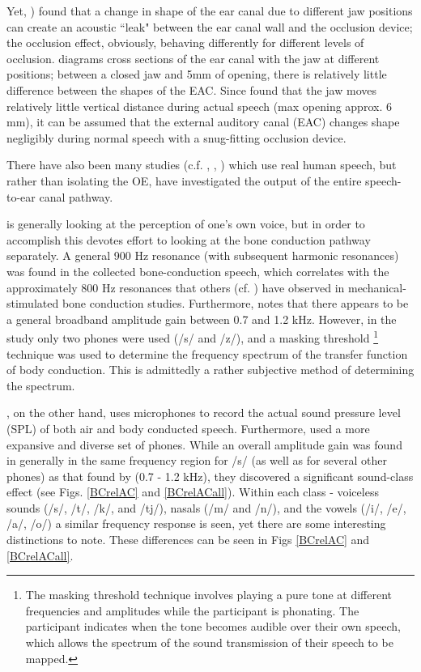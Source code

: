 \documentclass[dissertation,copyright]{uathesis}
\begin{document}
Yet, \cite{hansen:97b}) found that a change in shape of the ear canal due to different jaw positions can create an acoustic ``leak" between the ear canal wall and the occlusion device; the occlusion effect, obviously, behaving differently for different levels of occlusion. 
\cite{hansen:97b} diagrams cross sections of the ear canal with the jaw at different positions; between a closed jaw and 5mm of opening, there is relatively little difference between the shapes of the EAC.  Since \cite{borghese:97} found that the jaw moves relatively little vertical distance during actual speech (max opening approx. 6 mm), it can be assumed that the external auditory canal (EAC) changes shape negligibly during normal speech with a snug-fitting occlusion device. 



There have also been many studies (c.f. \cite{bekesy:48}, \cite{porschmann:00}, \cite{reinfeldt:10}) which use real human speech, but rather than isolating the OE, have investigated the output of the entire speech-to-ear canal pathway.

\cite{porschmann:00} is generally looking at the perception of one's own voice, but in order to accomplish this devotes effort to looking at the bone conduction pathway separately.  A general 900 Hz resonance (with subsequent harmonic resonances) was found in the collected bone-conduction speech, which correlates with the approximately 800 Hz resonances that others  (cf. \cite{tonndorf:97}) have observed in mechanical-stimulated bone conduction studies.  Furthermore, \cite{porschmann:00} notes that there appears to be a general broadband amplitude gain between 0.7 and 1.2 kHz. However, in the study only two phones were used (/s/ and /z/), and a masking threshold \footnote{The masking threshold technique involves playing a pure tone at different frequencies and amplitudes while the participant is phonating. The participant indicates when the tone becomes audible over their own speech, which allows the spectrum of the sound transmission of their speech to be mapped.} technique was used to determine the frequency spectrum of the transfer function of body conduction.  This is admittedly a rather subjective method of determining the spectrum.  

\cite{reinfeldt:10}, on the other hand, uses microphones to record the actual sound pressure level (SPL) of both air and body conducted speech. Furthermore, \cite{reinfeldt:10} used a more expansive and diverse set of phones.  While an overall amplitude gain was found in generally in the same frequency region for /s/ (as well as for several other phones) as that found by \cite{porschmann:00} (0.7 - 1.2 kHz), they discovered a significant sound-class effect (see Figs. \ref{BCrelAC} and \ref{BCrelACall}). Within each class - voiceless sounds (/s/, /t/, /k/, and /tj/),  nasals (/m/ and /n/), and the vowels (/i/, /e/, /a/, /o/) a similar frequency response is seen, yet there are some interesting distinctions to note. These differences can be seen in Figs \ref{BCrelAC} and \ref{BCrelACall}.
\end{document}
